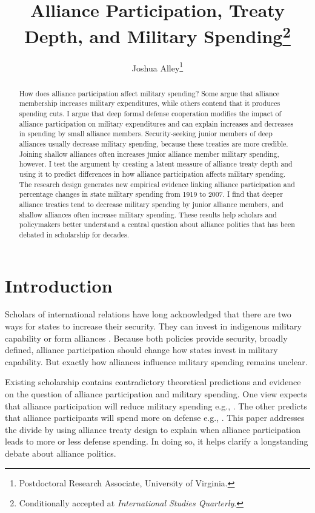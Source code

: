\documentclass[12pt]{article}
\title{\textbf{Alliance Participation, Treaty Depth, and Military Spending}\footnote{Conditionally accepted at \textit{International Studies Quarterly}.}}
\author{Joshua Alley\footnote{Postdoctoral Research Associate, University of Virginia.}}
\date{}
\begin{document}
\maketitle 

\doublespace 

\begin{abstract}
How does alliance participation affect military spending? 
Some argue that alliance membership increases military expenditures, while others contend that it produces spending cuts.
I argue that deep formal defense cooperation modifies the impact of alliance participation on military expenditures and can explain increases and decreases in spending by small alliance members.  
Security-seeking junior members of deep alliances usually decrease military spending, because these treaties are more credible.
Joining shallow alliances often increases junior alliance member military spending, however.    
I test the argument by creating a latent measure of alliance treaty depth and using it to predict differences in how alliance participation affects military spending. 
The research design generates new empirical evidence linking alliance participation and percentage changes in state military spending from 1919 to 2007. 
I find that deeper alliance treaties tend to decrease military spending by junior alliance members, and shallow alliances often increase military spending.  
These results help scholars and policymakers better understand a central question about alliance politics that has been debated in scholarship for decades. 
\end{abstract}


\newpage 


\section{Introduction}


Scholars of international relations have long acknowledged that there are two ways for states to increase their security. 
They can invest in indigenous military capability or form alliances \citep{Morgenthau1948, Altfield1984, Morrow1993}.
Because both policies provide security, broadly defined, alliance participation should change how states invest in military capability. 
But exactly how alliances influence military spending remains unclear. 


Existing scholarship contains contradictory theoretical predictions and evidence on the question of alliance participation and military spending. 
One view expects that alliance participation will reduce military spending e.g., \citep{BarnettLevy1991, Morrow1993, Conybeare1994}. 
The other predicts that alliance participants will spend more on defense e.g., \citep{Diehl1994, MorganPalmer2006, QuirozFlores2011}.
This paper addresses the divide by using alliance treaty design to explain when alliance participation leads to more or less defense spending. 
In doing so, it helps clarify a longstanding debate about alliance politics.
\end{document}

